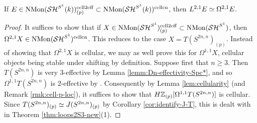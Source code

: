 \documentclass{amsart}
\numberwithin{proposition}{section}
\numberwithin{equation}{section}
\def\cell{\mathrm{cell}}
\def\NMon{\mathrm{NMon}}
\def\cn{\mathrm{cn}}
\def\hLoops{L}
\begin{document}
\begin{lemma} \label{lemm:cell-cn-loops}
If $E \in \NMon(\SH^{S^1}(k))^{\cell 2\eff}_{(p)} \subset \NMon(\SH^{S^1}(k))^{\cell\cn}$, then $\hLoops^{2,1} E \wequi \Omega^{2,1} E$.
\end{lemma}
\begin{proof}
It suffices to show that if $X \in \NMon(\SH^{S^1})_{(p)}^{\cell 2\eff} \subset \NMon(\SH^{S^1})$, then $\Omega^{2,1} X \in \NMon(\SH^{S^1})^{\cell\cn}$.
This reduces to the case $X = T(S^{2n,n})_{(p)}$.
Instead of showing that $\Omega^{2,1}X$ is cellular, we may as well prove this for $\Omega^{1,1}X$, cellular objects being stable under shifting by definition.
Suppose first that $n \ge 3$.
Then $T(S^{2n,n})$ is very $3$-effective by Lemma \ref{lemm:Dn-effectivity-Spc*}, and so $\Omega^{1,1} T(S^{2n,n})$ is $2$-effective by \cite[Proposition~4.2.1(2)]{freudenthal}.
Consequently by Lemma \ref{lem:cellularity} (and Remark \ref{rmk:cell-p-loc}), it suffices to show that $H\mathbb{Z}_{(p)}[\Omega^{1,1}T(S^{2n,n})]$ is cellular.
Since $T(S^{2n,n})_{(p)} \simeq J(S^{2n,n})_{(p)}$ by Corollary \ref{cor:identify-J-T}, this is dealt with in Theorem \ref{thm:loops2S3-new}(1).


\end{proof}
\end{document}
